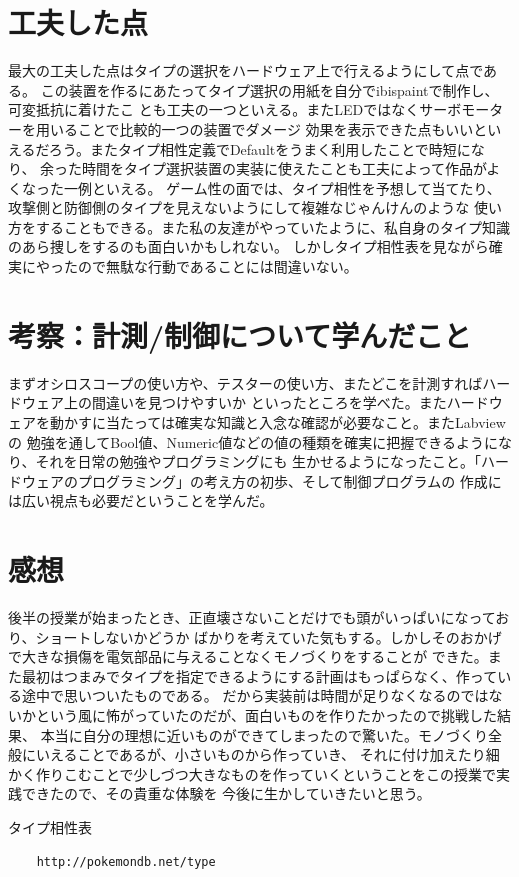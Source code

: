 \documentclass[a4paper,titlepage,11pt]{ltjsarticle}
\begin{document}
\section{工夫した点}
最大の工夫した点はタイプの選択をハードウェア上で行えるようにして点である。
この装置を作るにあたってタイプ選択の用紙を自分でibispaintで制作し、可変抵抗に着けたこ
とも工夫の一つといえる。またLEDではなくサーボモーターを用いることで比較的一つの装置でダメージ
効果を表示できた点もいいといえるだろう。またタイプ相性定義でDefaultをうまく利用したことで時短になり、
余った時間をタイプ選択装置の実装に使えたことも工夫によって作品がよくなった一例といえる。
ゲーム性の面では、タイプ相性を予想して当てたり、攻撃側と防御側のタイプを見えないようにして複雑なじゃんけんのような
使い方をすることもできる。また私の友達がやっていたように、私自身のタイプ知識のあら捜しをするのも面白いかもしれない。
しかしタイプ相性表を見ながら確実にやったので無駄な行動であることには間違いない。
\section{考察：計測/制御について学んだこと}
まずオシロスコープの使い方や、テスターの使い方、またどこを計測すればハードウェア上の間違いを見つけやすいか
といったところを学べた。またハードウェアを動かすに当たっては確実な知識と入念な確認が必要なこと。またLabviewの
勉強を通してBool値、Numeric値などの値の種類を確実に把握できるようになり、それを日常の勉強やプログラミングにも
生かせるようになったこと。「ハードウェアのプログラミング」の考え方の初歩、そして制御プログラムの
作成には広い視点も必要だということを学んだ。
\section{感想}
後半の授業が始まったとき、正直壊さないことだけでも頭がいっぱいになっており、ショートしないかどうか
ばかりを考えていた気もする。しかしそのおかげで大きな損傷を電気部品に与えることなくモノづくりをすることが
できた。また最初はつまみでタイプを指定できるようにする計画はもっぱらなく、作っている途中で思いついたものである。
だから実装前は時間が足りなくなるのではないかという風に怖がっていたのだが、面白いものを作りたかったので挑戦した結果、
本当に自分の理想に近いものができてしまったので驚いた。モノづくり全般にいえることであるが、小さいものから作っていき、
それに付け加えたり細かく作りこむことで少しづつ大きなものを作っていくということをこの授業で実践できたので、その貴重な体験を
今後に生かしていきたいと思う。
\begin{thebibliography}{}
 タイプ相性表
  \begin{verbatim}
    http://pokemondb.net/type
  \end{verbatim}
\end{thebibliography}
\end{document}
